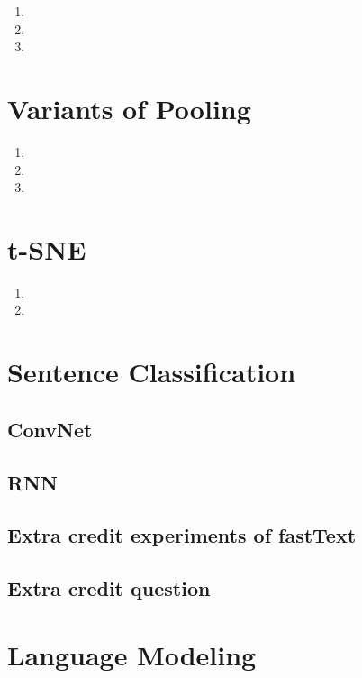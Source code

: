 \documentclass[a4paper]{article}
\begin{document}
\begin{enumerate}
\item{}
\item{}
\item{}
\end{enumerate}

\section{Variants of Pooling}
\begin{enumerate}
\item{}
\item{}
\item{}
\end{enumerate}

\section{t-SNE}
\begin{enumerate}
\item{}
\item{}
\end{enumerate}

\section{Sentence Classification}

\subsection{ConvNet}

\subsection{RNN}

\subsection{Extra credit experiments of fastText}

\subsection{Extra credit question}

\section{Language Modeling}
\end{document}
